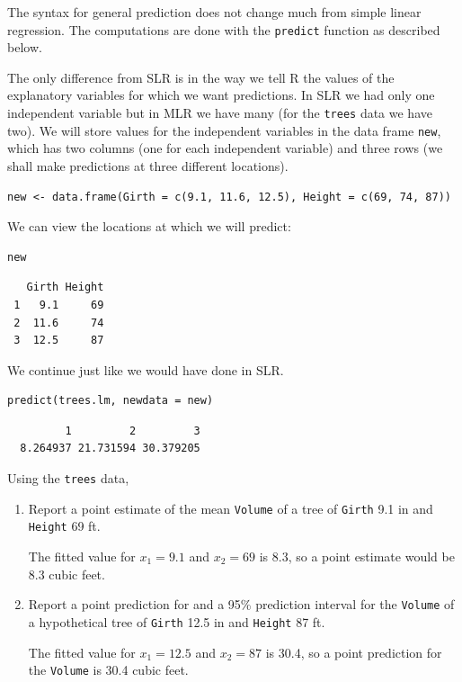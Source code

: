 \documentclass[captions=tableheading]{scrbook}
\begin{document}
The syntax for general prediction does not change much from simple linear regression. The computations are done with the \texttt{predict} function as described below. 

The only difference from SLR is in the way we tell \textsf{R} the values of the explanatory variables for which we want predictions. In SLR we had only one independent variable but in MLR we have many (for the \texttt{trees} data we have two). We will store values for the independent variables in the data frame \texttt{new}, which has two columns (one for each independent variable) and three rows (we shall make predictions at three different locations).


\begin{verbatim}
new <- data.frame(Girth = c(9.1, 11.6, 12.5), Height = c(69, 74, 87))
\end{verbatim}

We can view the locations at which we will predict:


\begin{verbatim}
new
\end{verbatim}

\begin{verbatim}
   Girth Height
 1   9.1     69
 2  11.6     74
 3  12.5     87
\end{verbatim}

We continue just like we would have done in SLR.


\begin{verbatim}
predict(trees.lm, newdata = new)
\end{verbatim}

\begin{verbatim}
         1         2         3 
  8.264937 21.731594 30.379205
\end{verbatim}



\begin{example}
Using the \texttt{trees} data,
\begin{enumerate}
\item Report a point estimate of the mean \texttt{Volume} of a tree of \texttt{Girth} 9.1 in and \texttt{Height} 69 ft.

   The fitted value for $x_{1}=9.1$ and $x_{2}=69$ is  8.3, so a point estimate would be  8.3 cubic feet.
\item Report a point prediction for and a 95\% prediction interval for the \texttt{Volume} of a hypothetical tree of \texttt{Girth} 12.5 in and \texttt{Height} 87 ft.

   The fitted value for $x_{1} = 12.5$ and $x_{2} = 87$ is  30.4, so a point prediction for the \texttt{Volume} is  30.4 cubic feet.
\end{enumerate}
\end{example}
\end{document}
